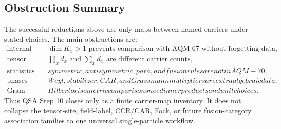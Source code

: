 \subsection{Obstruction Summary}

The successful reductions above are only maps between named carriers under
stated choices.  The main obstructions are:
\[
\begin{array}{ll}
\text{internal carriers} & \dim K_x>1 \text{ prevents comparison with AQM-67 without forgetting data},\\
\text{tensor coexistence} & \prod_x d_x \text{ and }\sum_x d_x \text{ are different carrier counts},\\
\text{statistics} & symmetric, antisymmetric, para, and fusion rules are not in AQM-70,\\
\text{phases} & Weyl, stabilizer, CAR, and Grassmann multipliers are extra algebraic data,\\
\text{Gram choices} & Hilbert or isometric comparisons need inner products and unit choices.
\end{array}
\]
Thus QSA Step 10 closes only as a finite carrier-map inventory.  It does not
collapse the tensor-site, field-label, CCR/CAR, Fock, or future
fusion-category association families to one universal single-particle
workflow.
